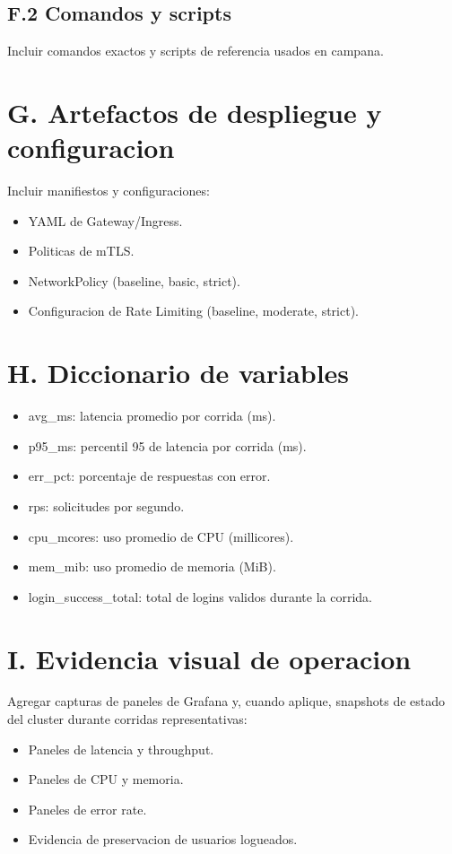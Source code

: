 \subsection{F.2 Comandos y scripts}
Incluir comandos exactos y scripts de referencia usados en campana.

\section{G. Artefactos de despliegue y configuracion}
\label{anx:artefactos}

Incluir manifiestos y configuraciones:
\begin{itemize}
  \item YAML de Gateway/Ingress.
  \item Politicas de mTLS.
  \item NetworkPolicy (baseline, basic, strict).
  \item Configuracion de Rate Limiting (baseline, moderate, strict).
\end{itemize}

\section{H. Diccionario de variables}
\label{anx:diccionario}

\begin{itemize}
  \item avg\_ms: latencia promedio por corrida (ms).
  \item p95\_ms: percentil 95 de latencia por corrida (ms).
  \item err\_pct: porcentaje de respuestas con error.
  \item rps: solicitudes por segundo.
  \item cpu\_mcores: uso promedio de CPU (millicores).
  \item mem\_mib: uso promedio de memoria (MiB).
  \item login\_success\_total: total de logins validos durante la corrida.
\end{itemize}

\section{I. Evidencia visual de operacion}
\label{anx:evidencia-visual}

Agregar capturas de paneles de Grafana y, cuando aplique, snapshots de estado del cluster durante corridas representativas:
\begin{itemize}
  \item Paneles de latencia y throughput.
  \item Paneles de CPU y memoria.
  \item Paneles de error rate.
  \item Evidencia de preservacion de usuarios logueados.
\end{itemize}

